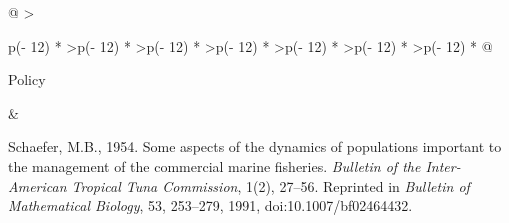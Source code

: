 \begin{longtable}[]{@{}
  >{\raggedright\arraybackslash}p{(\columnwidth - 12\tabcolsep) * }
  >{\raggedleft\arraybackslash}p{(\columnwidth - 12\tabcolsep) * }
  >{\raggedleft\arraybackslash}p{(\columnwidth - 12\tabcolsep) * }
  >{\raggedleft\arraybackslash}p{(\columnwidth - 12\tabcolsep) * }
  >{\raggedleft\arraybackslash}p{(\columnwidth - 12\tabcolsep) * }
  >{\raggedleft\arraybackslash}p{(\columnwidth - 12\tabcolsep) * }
  >{\raggedleft\arraybackslash}p{(\columnwidth - 12\tabcolsep) * }@{}}
\toprule\noalign{}
\begin{minipage}[b]{\linewidth}\raggedright
Policy
\end{minipage} & \begin{minipage}[b]{\linewidth}\raggedleft
Schaefer, M.B., 1954. Some aspects of the dynamics of populations important to the
management of the commercial marine fisheries. \emph{Bulletin of the Inter-American
Tropical Tuna Commission}, 1(2), 27--56. Reprinted in \emph{Bulletin of Mathematical
Biology}, 53, 253--279, 1991, doi:10.1007/bf02464432.


\end{minipage}
\end{longtable}
